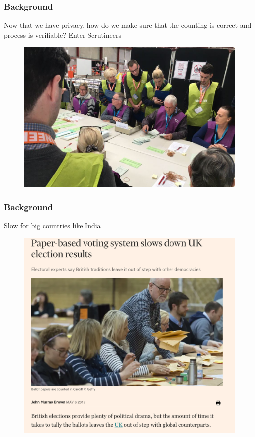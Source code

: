 \documentclass{beamer}
\begin{document}
\begin{frame}
\frametitle{Background}
{Now that we have privacy, how do we make sure that the counting 
is correct and process is verifiable? Enter Scrutineers}
\begin{figure}
	\begin{center}
	\includegraphics[scale=0.15]{scrutneers.jpg}
	\end{center}
  \end{figure}  
\end{frame}


\begin{frame}
\frametitle{Background}
{Slow for big countries like India}
\begin{figure}
	\begin{center}
	\includegraphics[scale=0.25]{uk-election.png}
	\end{center}
  \end{figure} 
\end{frame}
\end{document}
